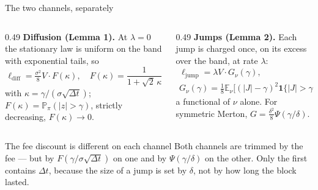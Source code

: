 \documentclass[10pt,xcolor=x11names,aspectratio=169]{beamer}
\newcommand{\dt}{\Delta t}
\newcommand{\E}{\mathbb{E}}
\newcommand{\Prob}{\mathbb{P}}
\newcommand{\1}{\mathbf{1}}
\begin{document}
\begin{frame}{The two channels, separately}
  \begin{columns}[T]
    \begin{column}{0.49\textwidth}
      \textbf{Diffusion (Lemma 1).} At $\lambda=0$ the stationary law is
      uniform on the band with exponential tails, so
      \[
        \ell_{\mathrm{diff}} = \tfrac{\sigma^2}{8}V\cdot F(\kappa),
        \quad F(\kappa) = \frac{1}{1+\sqrt2\,\kappa}
      \]
      with $\kappa = \gamma/(\sigma\sqrt{\dt})$; $F(\kappa) =
      \Prob_\pi(|z|>\gamma)$, strictly decreasing, $F(\kappa)\to0$.
    \end{column}
    \begin{column}{0.49\textwidth}
      \textbf{Jumps (Lemma 2).} Each jump is charged once, on its excess
      over the band, at rate $\lambda$:
      \[
        \begin{gathered}
          \ell_{\mathrm{jump}} = \lambda V\cdot G_\nu(\gamma),\\[2pt]
          G_\nu(\gamma) = \tfrac18\E_\nu\big[(|J|-\gamma)^2\1\{|J|>\gamma\}\big]
        \end{gathered}
      \]
      a functional of $\nu$ alone. For symmetric Merton,
      $G = \tfrac{\delta^2}{8}\Psi(\gamma/\delta)$.
    \end{column}
  \end{columns}
  \medskip
  \begin{block}{The fee discount is different on each channel}
    Both channels are trimmed by the fee --- but by $F(\gamma/\sigma\sqrt{\dt})$
    on one and by $\Psi(\gamma/\delta)$ on the other. Only the first
    contains $\dt$, because the size of a jump is set by $\delta$, not by how
    long the block lasted.
  \end{block}
\end{frame}
\end{document}
